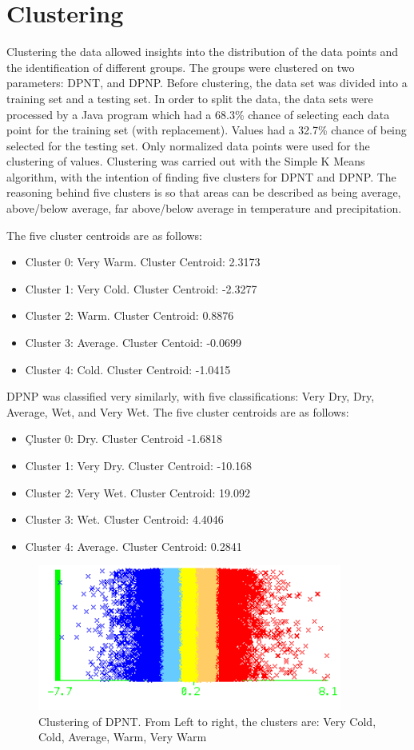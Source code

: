 \documentclass[11pt]{article}
\begin{document}
\section{Clustering}
Clustering the data allowed insights into the distribution of the data points and the identification of different groups. The groups were clustered on two parameters: DPNT, and DPNP. Before clustering, the data set was divided into a training set and a testing set. In order to split the data, the data sets were processed by a Java program which had a 68.3\% chance of selecting each data point for the training set (with replacement). Values had a 32.7\% chance of being selected for the testing set. Only normalized data points were used for the clustering of values. Clustering was carried out with the Simple K Means algorithm, with the intention of finding five clusters for DPNT and DPNP. The reasoning behind five clusters is so that areas can be described as being average, above/below average, far above/below average in temperature and precipitation.

The five cluster centroids are as follows:
\begin{itemize}
\item Cluster 0: Very Warm. Cluster Centroid: 2.3173
\item Cluster 1: Very Cold. Cluster Centroid: -2.3277
\item Cluster 2: Warm. Cluster Centroid: 0.8876
\item Cluster 3: Average. Cluster Centoid: -0.0699
\item Cluster 4: Cold. Cluster Centroid: -1.0415
\end{itemize}
DPNP was classified very similarly, with five classifications: Very Dry, Dry, Average, Wet, and Very Wet. The five cluster centroids are as follows:
\begin{itemize}
\item Çluster 0: Dry. Cluster Centroid -1.6818
\item Cluster 1: Very Dry. Cluster Centroid: -10.168
\item Cluster 2: Very Wet. Cluster Centroid: 19.092
\item Cluster 3: Wet. Cluster Centroid: 4.4046
\item Cluster 4: Average. Cluster Centroid: 0.2841
\end{itemize}
\begin{figure}
\centering
\includegraphics[width=10cm]{dpnt_cluster}
\caption{Clustering of DPNT. From Left to right, the clusters are: Very Cold, Cold, Average, Warm, Very Warm}
\label{fig:dpnt_cluster}
\end{figure}
\end{document}
